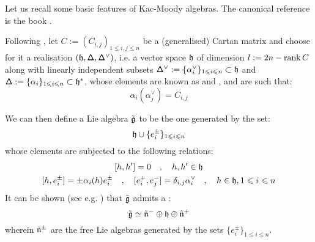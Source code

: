 Let us recall some basic features of Kac-Moody algebras. The canonical reference is the book \cite{kac_infinite_dimensional_lie_algebras}.

Following \cite[Chapter 1]{kac_infinite_dimensional_lie_algebras}, let $C := ( C_{i, j} )_{1 \leq i, j \leq n}$ be a (generalised) Cartan matrix and choose for it a realisation $(\mathfrak{h}, \mathsf{\Delta}, \mathsf{\Delta}^{\vee})$, i.e. a vector space $\mathfrak{h}$ of dimension $l := 2n - \operatorname{rank} C$ along with linearly independent subsets $\mathsf{\Delta}^{\vee} := \{ \alpha_i^{\vee} \}_{1 \leqslant i \leqslant n} \subset \mathfrak{h}$ and $\mathsf{\Delta} := \{ \alpha_i \}_{1 \leqslant i \leqslant n} \subset \mathfrak{h}^*$, whose elements are known as  and , and are such that:
    \begin{equation} \label{equation: cartan_matrix_entries}
        \alpha_i( \alpha_j^{\vee} ) = C_{i, j}
    \end{equation}

We can then define a Lie algebra $\tilde{\mathfrak{g}}$ to be the one generated by the set:
    \begin{equation} \label{equation: kac_moody_generators}
        \mathfrak{h} \cup \{ e_i^{\pm} \}_{1 \leqslant i \leqslant n}
    \end{equation}
whose elements are subjected to the following relations:
    \begin{equation} \label{equation: extended_kac_moody_relations}
        \begin{gathered}
            [h, h'] = 0 \quad, \quad h, h' \in \h
            \\
            [h, e_i^{\pm}] = \pm \alpha_i(h) e_i^{\pm} \quad, \quad [e_i^+, e_j^-] = \delta_{i, j} \alpha_i^{\vee} \quad, \quad h \in \h, 1 \leq i \leq n
        \end{gathered}
    \end{equation}
It can be shown (see e.g. \cite[Theorem 1.2]{kac_infinite_dimensional_lie_algebras}) that $\tilde{\mathfrak{g}}$ admits a :
    $$\tilde{\mathfrak{g}} \simeq \tilde{\mathfrak{n}}^- \oplus \mathfrak{h} \oplus \tilde{\mathfrak{n}}^+$$
wherein $\tilde{\mathfrak{n}}^{\pm}$ are the free Lie algebras generated by the sets $\{ e_i^{\pm} \}_{1 \leq i \leq n}$.
    
